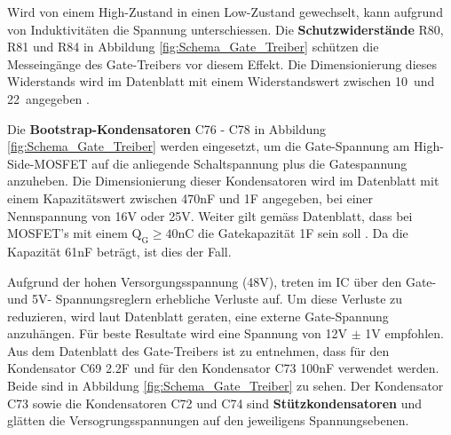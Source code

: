 Wird von einem High-Zustand in einen Low-Zustand gewechselt, kann aufgrund von Induktivitäten die Spannung unterschiessen. Die \textbf{Schutzwiderstände} R80, R81 und R84 in Abbildung \ref{fig:Schema_Gate_Treiber} schützen die Messeingänge des Gate-Treibers vor diesem Effekt.
Die Dimensionierung dieses Widerstands wird im Datenblatt mit einem Widerstandswert zwischen 10\textOmega\ und 22\textOmega\ angegeben \cite[S.10]{trinamicmotion_control_gmbh__co_kg_tmc6200_2019}.



Die \textbf{Bootstrap-Kondensatoren} C76 - C78 in Abbildung \ref{fig:Schema_Gate_Treiber} werden eingesetzt, um die Gate-Spannung am High-Side-MOSFET auf die anliegende Schaltspannung plus die Gatespannung anzuheben.
Die Dimensionierung dieser Kondensatoren wird im Datenblatt mit einem Kapazitätswert zwischen 470nF und 1\textmugreek F angegeben, bei einer Nennspannung von 16V oder 25V. Weiter gilt gemäss Datenblatt, dass bei MOSFET's mit einem $\mathrm{Q_G \geq 40nC}$ die Gatekapazität 1\textmugreek F sein soll \cite[S.10]{trinamicmotion_control_gmbh__co_kg_tmc6200_2019}. Da die Kapazität 61nF beträgt, ist dies der Fall. 



Aufgrund der hohen Versorgungsspannung (48V), treten im IC über den Gate- und 5V- Spannungsreglern erhebliche Verluste auf. Um diese Verluste zu reduzieren, wird laut Datenblatt geraten, eine externe Gate-Spannung anzuhängen. Für beste Resultate wird eine Spannung von 12V $\pm$ 1V empfohlen.
Aus dem Datenblatt des Gate-Treibers ist zu entnehmen, dass für den Kondensator C69 2.2\textmugreek F und für den Kondensator C73 100nF verwendet werden. Beide sind in Abbildung \ref{fig:Schema_Gate_Treiber} zu sehen. Der Kondensator C73 sowie die Kondensatoren C72 und C74 sind \textbf{Stützkondensatoren} und glätten die Versogrungsspannungen auf den jeweiligens Spannungsebenen.

